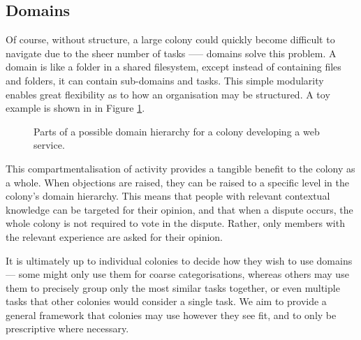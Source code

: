 \subsection{Domains}\label{sec:domains}

Of course, without structure, a large colony could quickly become difficult to navigate due to the sheer number of tasks —-- domains solve this problem. A domain is like a folder in a shared filesystem, except instead of containing files and folders, it can contain sub-domains and tasks. This simple modularity enables great flexibility as to how an organisation may be structured. A toy example is shown in in Figure \ref{fig:domainhierarchysample}.

\begin{figure}[h]
    \centering
 \caption{Parts of a possible domain hierarchy for a colony developing a web service.}
 \label{fig:domainhierarchysample}

\end{figure}

This compartmentalisation of activity provides a tangible benefit to the colony as a whole. When objections are raised, they can be raised to a specific level in the colony's domain hierarchy. This means that people with relevant contextual knowledge can be targeted for their opinion, and that when a dispute occurs, the whole colony is not required to vote in the dispute. Rather, only members with the relevant experience are asked for their opinion.

It is ultimately up to individual colonies to decide how they wish to use domains --- some might only use them for coarse categorisations, whereas others may use them to precisely group only the most similar tasks together, or even multiple tasks that other colonies would consider a single task. We aim to provide a general framework that colonies may use however they see fit, and to only be prescriptive where necessary.

